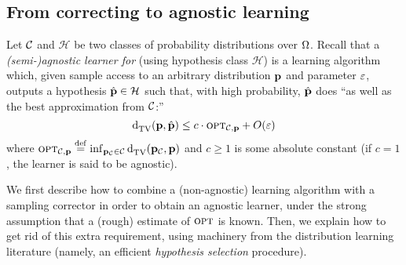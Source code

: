 \subsection{From correcting to agnostic learning}\label{ssec:connections:agnostic}

Let $\mathcal{C}$  and $\mathcal{H}$ be two classes of probability distributions over ${\Omega}$. Recall that a \emph{(semi-)agnostic learner for \class} (using hypothesis class $\mathcal{H}$) is a learning algorithm \Algo which, given sample access to an arbitrary distribution $\mathbf{p}$ 
and parameter $\varepsilon$, outputs a hypothesis $\hat{\mathbf{p}}\in\mathcal{H}$ such that, with high probability, $\hat{\mathbf{p}}$ does ``as well as the best approximation from $ \mathcal{C}$:''
\[
	\totalvardist{\D}{\hat{\D}} \leq c\cdot\opt_{\class,\D} + \bigO{\eps}
\]
where ${\textsc{opt}}_{\mathcal{C},\mathbf{p}}\stackrel{\rm def}{=} \inf_{\mathbf{p}_{\mathcal{C}}\in\mathcal{C}} {\operatorname{d}_{\rm{TV}}^{}\!\left({\mathbf{p}_{\mathcal{C}}, \mathbf{p}}\right)}$ and $c\geq 1$ is some absolute constant (if $c=1$, the learner is said to be agnostic).\medskip

We first describe how to combine a (non-agnostic) learning algorithm with a sampling corrector in order to obtain an agnostic learner, under the strong assumption that a (rough) estimate of ${\textsc{opt}}$ is known. Then, we explain how to get rid of this extra requirement, using machinery from the distribution learning literature (namely, an efficient \emph{hypothesis selection} procedure).

